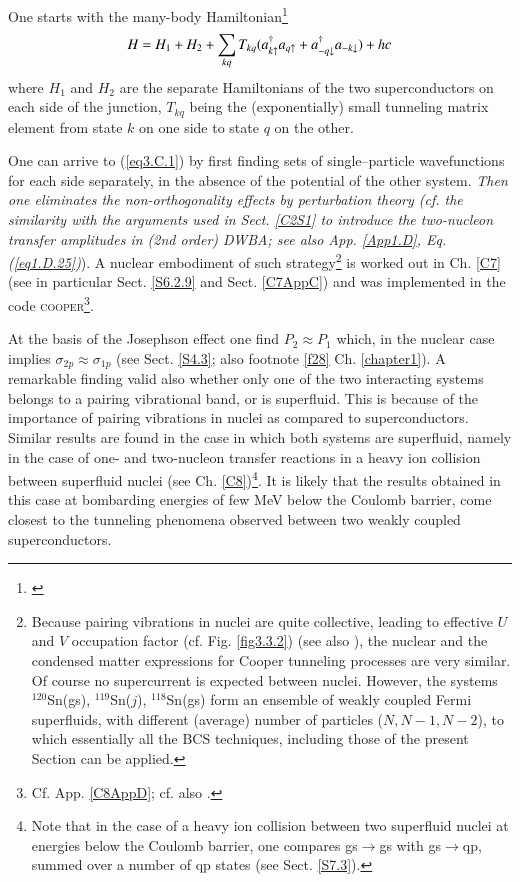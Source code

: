 One starts with the many-body Hamiltonian\footnote{\cite{Cohen:62}}
\begin{align}\label{eq3.C.1}
H=H_1+H_2+\sum_{kq}T_{kq}(a_{k\uparrow}^\dagger a_{q\uparrow}+a_{-q\downarrow}^\dagger a_{-k\downarrow})+hc \idx{Weak link between superconductors!tunneling Hamiltonian}
\end{align}
where $H_1$ and $H_2$ are the separate Hamiltonians of the two superconductors on each side of the junction, $T_{kq}$ being the (exponentially) small tunneling matrix element from state $k$ on one side to state $q$ on the other.


One can arrive to  (\ref{eq3.C.1}) by first finding sets of single--particle wavefunctions for each side separately, in the absence of the potential of the other system. \textit{Then one eliminates the non-orthogonality effects by perturbation theory (cf. the similarity with the arguments used in Sect. \ref{C2S1} to introduce the two-nucleon transfer amplitudes in (2nd order) DWBA; see also App. \ref{App1.D}, Eq. (\ref{eq1.D.25})}). A nuclear embodiment of such strategy\footnote{\label{f45}Because  pairing vibrations in nuclei are quite collective, leading to effective $U$ and $V$ occupation factor (cf. Fig. \ref{fig3.3.2}) (see also \cite{Potel:13b}), the nuclear and the condensed matter expressions for Cooper tunneling processes are very similar. Of course no supercurrent is expected between nuclei. However, the systems $^{120}$Sn(gs), $^{119}$Sn($j$), $^{118}$Sn(gs) form an ensemble of weakly coupled Fermi superfluids, with different (average) number of particles ($N,N-1,N-2$), to which essentially all the BCS techniques, including those of the present Section can be applied.} is worked out in Ch. \ref{C7} (see in particular Sect. \ref{S6.2.9} and Sect. \ref{C7AppC}) and was implemented in the code \textsc{cooper}\footnote{Cf. App. \ref{C8AppD}; cf. also \cite{Broglia:04a}.}. 


At the basis of the Josephson effect one find $P_2\approx P_1$ which, in the nuclear case implies $\sigma_{2p}\approx\sigma_{1p}$ (see Sect. \ref{S4.3}; also footnote \ref{f28} Ch. \ref{chapter1}). A remarkable finding  valid also whether only one of the two interacting systems belongs to a  pairing vibrational band, or is superfluid. This is because of the importance of pairing vibrations in nuclei as compared to superconductors. Similar results are found in the case in which both systems are superfluid, namely in the case of  one- and two-nucleon transfer reactions in a heavy ion collision between superfluid nuclei (see Ch. \ref{C8})\footnote{Note that in the case of a heavy ion collision between two superfluid nuclei at energies below the Coulomb barrier, one compares gs$\to$gs with gs$\to$qp, summed over a number of qp states (see Sect. \ref{S7.3}).}. 
It is likely that the results obtained in this case at bombarding energies of few MeV below the Coulomb barrier, come closest to the tunneling phenomena observed between two weakly coupled superconductors.

